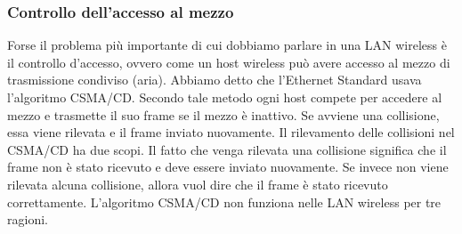 \subsubsection{Controllo dell'accesso al mezzo}
Forse il problema più importante di cui dobbiamo parlare in una LAN wireless è il controllo d'accesso, ovvero come un host wireless può avere accesso al mezzo di trasmissione condiviso (aria). Abbiamo detto che l'Ethernet Standard usava l'algoritmo CSMA/CD. Secondo tale metodo ogni host compete per accedere al mezzo e trasmette il suo frame se il mezzo è inattivo. Se avviene una collisione, essa viene rilevata e il frame inviato nuovamente. Il rilevamento delle collisioni nel CSMA/CD ha due scopi. Il fatto che venga rilevata una collisione significa che il frame non è stato ricevuto e deve essere inviato nuovamente. Se invece non viene rilevata alcuna collisione, allora vuol dire che il frame è stato ricevuto correttamente. L'algoritmo CSMA/CD non funziona nelle LAN wireless per tre ragioni.
